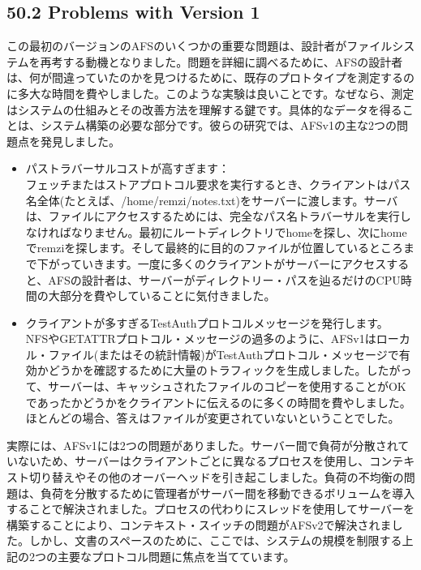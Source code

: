 \hypertarget{problems-with-version-1}{%
\subsection*{50.2 Problems with Version
1}\label{problems-with-version-1}}

この最初のバージョンのAFSのいくつかの重要な問題は、設計者がファイルシステムを再考する動機となりました。問題を詳細に調べるために、AFSの設計者は、何が間違っていたのかを見つけるために、既存のプロトタイプを測定するのに多大な時間を費やしました。このような実験は良いことです。なぜなら、測定はシステムの仕組みとその改善方法を理解する鍵です。具体的なデータを得ることは、システム構築の必要な部分です。彼らの研究では、AFSv1の主な2つの問題点を発見しました。

\begin{itemize}
\item
  パストラバーサルコストが高すぎます：\\
  フェッチまたはストアプロトコル要求を実行するとき、クライアントはパス名全体(たとえば、/home/remzi/notes.txt)をサーバーに渡します。サーバは、ファイルにアクセスするためには、完全なパス名トラバーサルを実行しなければなりません。最初にルートディレクトリでhomeを探し、次にhomeでremziを探します。そして最終的に目的のファイルが位置しているところまで下がっていきます。一度に多くのクライアントがサーバーにアクセスすると、AFSの設計者は、サーバーがディレクトリー・パスを辿るだけのCPU時間の大部分を費やしていることに気付きました。
\item
  クライアントが多すぎるTestAuthプロトコルメッセージを発行します。\\
  NFSやGETATTRプロトコル・メッセージの過多のように、AFSv1はローカル・ファイル(またはその統計情報)がTestAuthプロトコル・メッセージで有効かどうかを確認するために大量のトラフィックを生成しました。したがって、サーバーは、キャッシュされたファイルのコピーを使用することがOKであったかどうかをクライアントに伝えるのに多くの時間を費やしました。ほとんどの場合、答えはファイルが変更されていないということでした。
\end{itemize}

実際には、AFSv1には2つの問題がありました。サーバー間で負荷が分散されていないため、サーバーはクライアントごとに異なるプロセスを使用し、コンテキスト切り替えやその他のオーバーヘッドを引き起こしました。負荷の不均衡の問題は、負荷を分散するために管理者がサーバー間を移動できるボリュームを導入することで解決されました。プロセスの代わりにスレッドを使用してサーバーを構築することにより、コンテキスト・スイッチの問題がAFSv2で解決されました。しかし、文書のスペースのために、ここでは、システムの規模を制限する上記の2つの主要なプロトコル問題に焦点を当てています。

